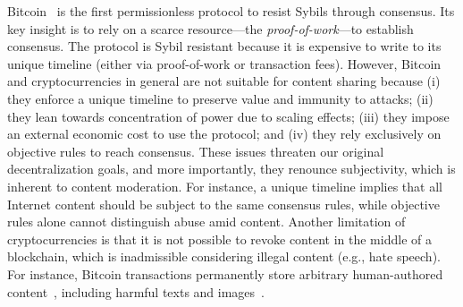 \documentclass[12pt]{article}
\begin{document}
Bitcoin~\cite{p2p.bitcoin} is the first permissionless protocol to resist
Sybils through consensus.
Its key insight is to rely on a scarce resource---the \emph{proof-of-work}---to
establish consensus.
The protocol is Sybil resistant because it is expensive to write to its
unique timeline (either via proof-of-work or transaction fees).
%
However, Bitcoin and cryptocurrencies in general are not suitable for content
sharing because
    (i)   they enforce a unique timeline to preserve value and immunity to
          attacks;
    (ii)  they lean towards concentration of power due to scaling effects;
    (iii) they impose an external economic cost to use the protocol; and
    (iv)  they rely exclusively on objective rules to reach consensus.
%
These issues threaten our original decentralization goals, and more
importantly, they renounce subjectivity, which is inherent to content
moderation.
%
For instance, a unique timeline implies that all Internet content should be
subject to the same consensus rules, while objective rules alone cannot
distinguish abuse amid content.
%
Another limitation of cryptocurrencies is that it is not possible to revoke
content in the middle of a blockchain, which is inadmissible considering
illegal content (e.g., hate speech).
For instance, Bitcoin transactions permanently store arbitrary human-authored
content~\cite{btc.data}, including harmful texts and images~\cite{btc.content}.
\end{document}
